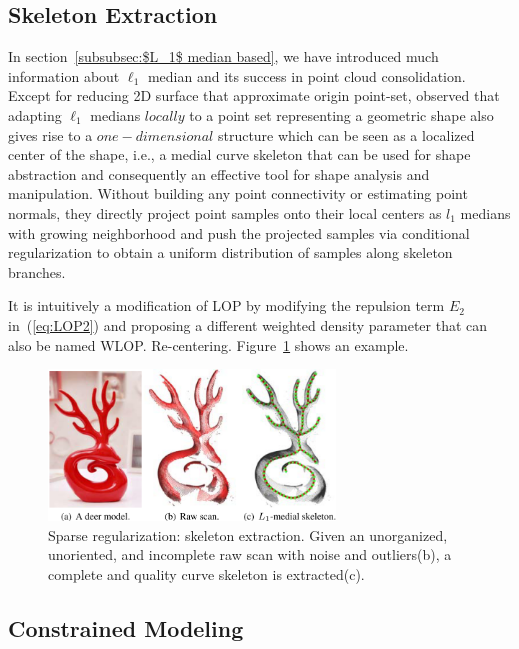 


\subsection{Skeleton Extraction}
In section~\ref{subsubsec:$L_1$ median based}, we have introduced much information about $\ell_1$ median and its success in point cloud consolidation.
Except for reducing 2D surface that approximate origin point-set,
\cite{huang2013l1} observed that adapting $\ell_1$ medians $locally$ to a point set representing a geometric shape also gives rise to a $one-dimensional$ structure which can be seen as a localized center of the shape, i.e., a medial curve skeleton that can be used for shape abstraction and consequently an effective tool for shape analysis and manipulation\cite{cornea2007curve}.
Without building any point connectivity or estimating point normals, they directly project point samples onto their local centers as $l_1$ medians with growing neighborhood and push the projected samples via conditional regularization to obtain a uniform distribution of samples along skeleton branches.

It is intuitively a modification of LOP by modifying the repulsion term $E_2$ in~(\ref{eq:LOP2}) and proposing a different weighted density parameter that can also be named WLOP\cite{huang2009consolidation}. Re-centering. Figure~\ref{fig:skeleton extraction} shows an example.

\begin{figure}[ht]
  \centering
  \includegraphics[width=3in]{images/skeleton_L1}
  \caption{Sparse regularization: skeleton extraction\cite{huang2013l1}. Given an unorganized, unoriented, and incomplete raw scan with noise and outliers(b), a complete and quality curve skeleton is extracted(c).}
  \label{fig:skeleton extraction}
\end{figure}


\subsection{Constrained Modeling}

